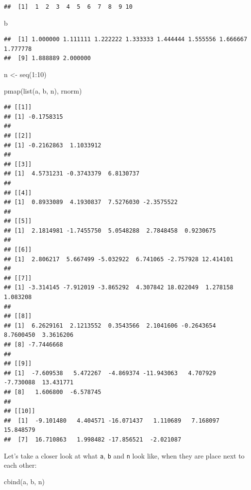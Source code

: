 \documentclass[
]{article}
\newenvironment{Shaded}{\begin{snugshade}}{\end{snugshade}}
\newcommand{\DecValTok}[1]{\textcolor[rgb]{0.00,0.00,0.81}{#1}}
\newcommand{\FunctionTok}[1]{\textcolor[rgb]{0.00,0.00,0.00}{#1}}
\newcommand{\NormalTok}[1]{#1}
\newcommand{\OtherTok}[1]{\textcolor[rgb]{0.56,0.35,0.01}{#1}}
\newcommand{\SpecialCharTok}[1]{\textcolor[rgb]{0.00,0.00,0.00}{#1}}
\begin{document}
\begin{verbatim}
##  [1]  1  2  3  4  5  6  7  8  9 10
\end{verbatim}

\begin{Shaded}
\begin{Highlighting}[]
\NormalTok{b}
\end{Highlighting}
\end{Shaded}

\begin{verbatim}
##  [1] 1.000000 1.111111 1.222222 1.333333 1.444444 1.555556 1.666667 1.777778
##  [9] 1.888889 2.000000
\end{verbatim}

\begin{Shaded}
\begin{Highlighting}[]
\NormalTok{n }\OtherTok{\textless{}{-}} \FunctionTok{seq}\NormalTok{(}\DecValTok{1}\SpecialCharTok{:}\DecValTok{10}\NormalTok{)}

\FunctionTok{pmap}\NormalTok{(}\FunctionTok{list}\NormalTok{(a, b, n), rnorm)}
\end{Highlighting}
\end{Shaded}

\begin{verbatim}
## [[1]]
## [1] -0.1758315
## 
## [[2]]
## [1] -0.2162863  1.1033912
## 
## [[3]]
## [1]  4.5731231 -0.3743379  6.8130737
## 
## [[4]]
## [1]  0.8933089  4.1930837  7.5276030 -2.3575522
## 
## [[5]]
## [1]  2.1814981 -1.7455750  5.0548288  2.7848458  0.9230675
## 
## [[6]]
## [1]  2.806217  5.667499 -5.032922  6.741065 -2.757928 12.414101
## 
## [[7]]
## [1] -3.314145 -7.912019 -3.865292  4.307842 18.022049  1.278158  1.083208
## 
## [[8]]
## [1]  6.2629161  2.1213552  0.3543566  2.1041606 -0.2643654  8.7600450  3.3616206
## [8] -7.7446668
## 
## [[9]]
## [1]  -7.609538   5.472267  -4.869374 -11.943063   4.707929  -7.730088  13.431771
## [8]   1.606800  -6.578745
## 
## [[10]]
##  [1]  -9.101480   4.404571 -16.071437   1.110689   7.168097  15.848579
##  [7]  16.710863   1.998482 -17.856521  -2.021087
\end{verbatim}

Let's take a closer look at what \texttt{a}, \texttt{b} and \texttt{n} look like, when they are place next to each other:

\begin{Shaded}
\begin{Highlighting}[]
\FunctionTok{cbind}\NormalTok{(a, b, n)}
\end{Highlighting}
\end{Shaded}
\end{document}
